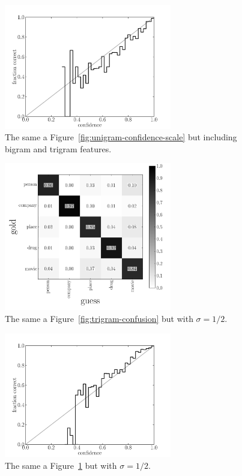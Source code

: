 \documentclass[11pt]{article}
\newcommand{\fig}[1]{Figure~\ref{fig:#1}}
\newcommand{\figlabel}[1]{\label{fig:#1}}
\begin{document}
\begin{figure}[htbp]
\begin{center}
    \includegraphics[width=0.65\textwidth]{trigram_confidence_scale.pdf}
\end{center}
\caption{%
The same a \fig{unigram-confidence-scale} but including bigram and trigram
features.
\figlabel{trigram-confidence-scale}}
\end{figure}

\begin{figure}[htbp]
\begin{center}
    \includegraphics[width=0.65\textwidth]{trigram_0_5_confusion.pdf}
\end{center}
\caption{%
The same a \fig{trigram-confusion} but with $\sigma = 1/2$.
\figlabel{trigram-0.5-confusion}}
\end{figure}

\begin{figure}[htbp]
\begin{center}
    \includegraphics[width=0.65\textwidth]{trigram_0_5_confidence_scale.pdf}
\end{center}
\caption{%
The same a \fig{trigram-confidence-scale} but with $\sigma = 1/2$.
\figlabel{trigram-0.5-confidence-scale}}
\end{figure}
\end{document}
